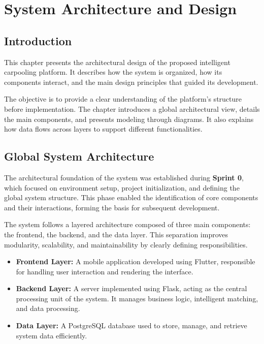 \chapter{System Architecture and Design}

\section{Introduction}

This chapter presents the architectural design of the proposed intelligent carpooling platform. It describes how the system is organized, how its components interact, and the main design principles that guided its development.

The objective is to provide a clear understanding of the platform's structure before implementation. The chapter introduces a global architectural view, details the main components, and presents modeling through diagrams. It also explains how data flows across layers to support different functionalities.

\section{Global System Architecture}

The architectural foundation of the system was established during \textbf{Sprint 0}, which focused on environment setup, project initialization, and defining the global system structure. This phase enabled the identification of core components and their interactions, forming the basis for subsequent development.

The system follows a layered architecture composed of three main components: the frontend, the backend, and the data layer. This separation improves modularity, scalability, and maintainability by clearly defining responsibilities.

\begin{itemize}
    \item \textbf{Frontend Layer:} A mobile application developed using Flutter, responsible for handling user interaction and rendering the interface.
    
    \item \textbf{Backend Layer:} A server implemented using Flask, acting as the central processing unit of the system. It manages business logic, intelligent matching, and data processing.
    
    \item \textbf{Data Layer:} A PostgreSQL database used to store, manage, and retrieve system data efficiently.
\end{itemize}

